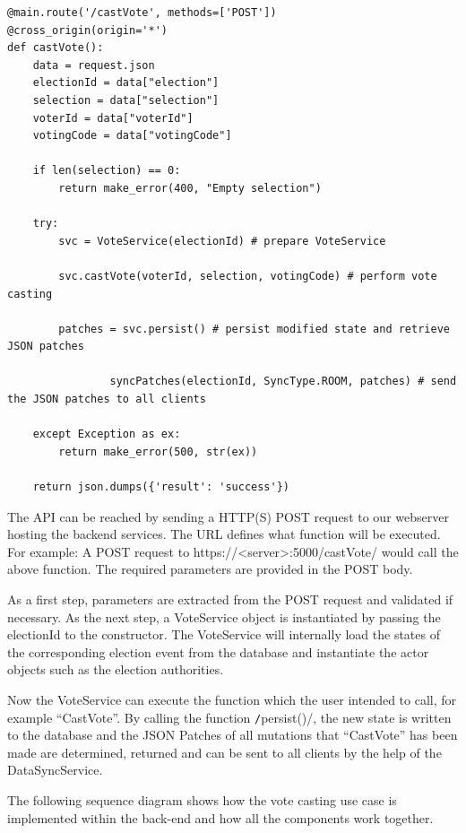 \begin{verbatim}
@main.route('/castVote', methods=['POST'])
@cross_origin(origin='*')
def castVote():
    data = request.json
    electionId = data["election"]
    selection = data["selection"]
    voterId = data["voterId"]
    votingCode = data["votingCode"]

    if len(selection) == 0:
        return make_error(400, "Empty selection")

    try:        
        svc = VoteService(electionId) # prepare VoteService
        
        svc.castVote(voterId, selection, votingCode) # perform vote casting
        
        patches = svc.persist()	# persist modified state and retrieve JSON patches
        
				syncPatches(electionId, SyncType.ROOM, patches)	# send the JSON patches to all clients

    except Exception as ex:
        return make_error(500, str(ex))

    return json.dumps({'result': 'success'})
\end{verbatim}

The API can be reached by sending a HTTP(S) POST request to our webserver hosting the backend services. The URL defines what function will be executed. For example: A POST request to https://<server>:5000/castVote/ would call the above function. The required parameters are provided in the POST body.

As a first step, parameters are extracted from the POST request and validated if necessary. As the next step, a VoteService object is instantiated by passing the electionId to the constructor. The VoteService will internally load the states of the corresponding election event from the database and instantiate the actor objects such as the election authorities.

Now the VoteService can execute the function which the user intended to call, for example "`CastVote"'. By calling the function \texttt/persist()/, the new state is written to the database and the JSON Patches of all mutations that "`CastVote"' has been made are determined, returned and can be sent to all clients by the help of the DataSyncService.

The following sequence diagram shows how the vote casting use case is implemented within the back-end and how all the components work together.


